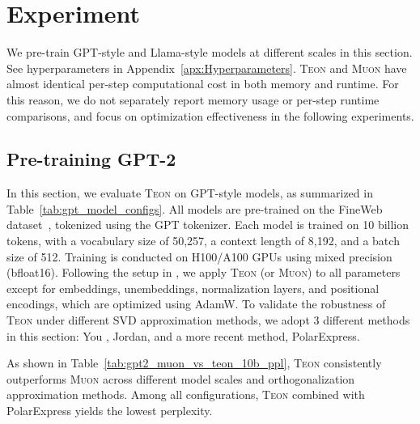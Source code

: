 \documentclass{article}
\theoremstyle{plain}
\theoremstyle{definition}
\theoremstyle{remark}
\begin{document}
\section{Experiment}
\label{sec:experiment}
We pre-train GPT-style and Llama-style models at different scales in this section. See hyperparameters in Appendix~\ref{apx:Hyperparameters}. \textsc{Teon} and \textsc{Muon} have almost identical per-step computational cost in both memory and runtime. For this reason, we do not separately report memory usage or per-step runtime comparisons, and focus on optimization effectiveness in the following experiments.

\subsection{Pre-training GPT-2}

\label{exp:GPT_pretraining}

In this section, we evaluate \textsc{Teon} on GPT-style models, as summarized in Table~\ref{tab:gpt_model_configs}. All models are pre-trained on the FineWeb dataset~\cite{penedo2024fineweb}, tokenized using the GPT tokenizer. Each model is trained on 10 billion tokens, with a vocabulary size of 50,257, a context length of 8,192, and a batch size of 512. Training is conducted on H100/A100 GPUs using mixed precision (bfloat16). Following the setup in \cite{amsel2025polar}, we apply \textsc{Teon} (or \textsc{Muon}) to all parameters except for embeddings, unembeddings, normalization layers, and positional encodings, which are optimized using AdamW. To validate the robustness of \textsc{Teon} under different SVD approximation methods, we adopt 3 different methods in this section: You \cite{you2019large}, Jordan\cite{jordan2024muon}, and a more recent method, PolarExpress\cite{amsel2025polar}.

As shown in Table~\ref{tab:gpt2_muon_vs_teon_10b_ppl}, \textsc{Teon} consistently outperforms \textsc{Muon} across different model scales and orthogonalization approximation methods. Among all configurations, \textsc{Teon} combined with PolarExpress yields the lowest perplexity.
\end{document}
